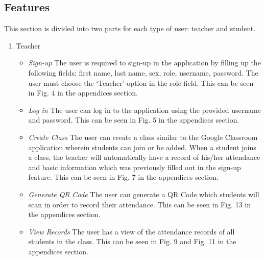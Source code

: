 \documentclass[journal]{./IEEE/IEEEtran}
\begin{document}
\subsection{Features}
This section is divided into two parts for each type of user: teacher and student.
\newline
\begin{enumerate}
    \item [1.]  Teacher
    \begin{itemize}
        \item \textit{Sign-up}
        \newline
The user is required to sign-up in the application by filling up the following fields; first name, last name, sex, role, username, password. The user must choose the ‘Teacher’ option in the role field. This can be seen in Fig. 4 in the appendices section.
        \item \textit{Log in}
        \newline
        The user can log in to the application using the provided username and password. This can be seen in Fig. 5 in the appendices section.
         \item \textit{Create Class}
        \newline
        The user can create a class similar to the Google Classroom application wherein students can join or be added. When a student joins a class, the teacher will automatically have a record of his/her attendance and basic information which was previously filled out in the sign-up feature. This can be seen in Fig. 7 in the appendices section.
         \item \textit{Generate QR Code}
        \newline
        The user can generate a QR Code which students will scan in order to record their attendance. This can be seen in Fig. 13 in the appendices section.
         \item \textit{View Records}
        \newline
        The user has a view of the attendance records of all students in the class. This can be seen in Fig. 9 and Fig. 11 in the appendices section.


\end{itemize}
\end{enumerate}
\end{document}
